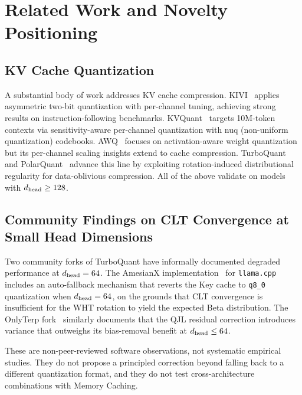 
\section{Related Work and Novelty Positioning}
\label{sec:related}

\subsection{KV Cache Quantization}

A substantial body of work addresses KV cache compression.
KIVI~\cite{liu2024kivi} applies asymmetric two-bit quantization with
per-channel tuning, achieving strong results on instruction-following
benchmarks.
KVQuant~\cite{hooper2024kvquant} targets 10M-token contexts via
sensitivity-aware per-channel quantization with nuq (non-uniform
quantization) codebooks.
AWQ~\cite{lin2024awq} focuses on activation-aware weight quantization
but its per-channel scaling insights extend to cache compression.
TurboQuant~\cite{zandieh2025turboquant} and
PolarQuant~\cite{han2025polarquant} advance this line by exploiting
rotation-induced distributional regularity for data-oblivious
compression.
All of the above validate on models with $d_{\text{head}} \geq 128$.

\subsection{Community Findings on CLT Convergence at Small Head Dimensions}

Two community forks of TurboQuant have informally documented degraded
performance at $d_{\text{head}} = 64$.
The AmesianX implementation~\cite{amesianx2025turboquant} for
\texttt{llama.cpp} includes an auto-fallback mechanism that reverts the
Key cache to \texttt{q8\_0} quantization when $d_{\text{head}} = 64$, on the
grounds that CLT convergence is insufficient for the WHT rotation to
yield the expected Beta distribution.
The OnlyTerp fork~\cite{onlyterp2025turboquant} similarly documents
that the QJL residual correction introduces variance that outweighs
its bias-removal benefit at $d_{\text{head}} \leq 64$.

These are non-peer-reviewed software observations, not systematic
empirical studies.
They do not propose a principled correction beyond falling back to
a different quantization format, and they do not test
cross-architecture combinations with Memory Caching.

